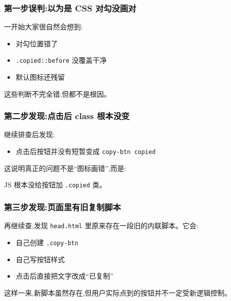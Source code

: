\documentclass[lang=cn,scheme=chinese,color=blue,device=normal,toc=onecol,math=cm]{elegantbook}
\begin{document}
\subsubsection{第一步误判:以为是 CSS 对勾没画对}


一开始大家很自然会想到:\par


\begin{itemize}
\item 对勾位置错了
\item \texttt{.copied::before} 没覆盖干净
\item 默认图标还残留
\end{itemize}


这些判断不完全错,但都不是根因。\par


\subsubsection{第二步发现:点击后 class 根本没变}


继续排查后发现:\par


\begin{itemize}
\item 点击后按钮并没有短暂变成 \texttt{copy-btn copied}
\end{itemize}


这说明真正的问题不是“图标画错”,而是:\par


\begin{quotebox}
JS 根本没给按钮加 \texttt{.copied} 类。\par
\end{quotebox}


\subsubsection{第三步发现:页面里有旧复制脚本}


再继续查,发现 \texttt{head.html} 里原来存在一段旧的内联脚本。它会:\par


\begin{itemize}
\item 自己创建 \texttt{.copy-btn}
\item 自己写按钮样式
\item 点击后直接把文字改成“已复制”
\end{itemize}


这样一来,新脚本虽然存在,但用户实际点到的按钮并不一定受新逻辑控制。\par
\end{document}
